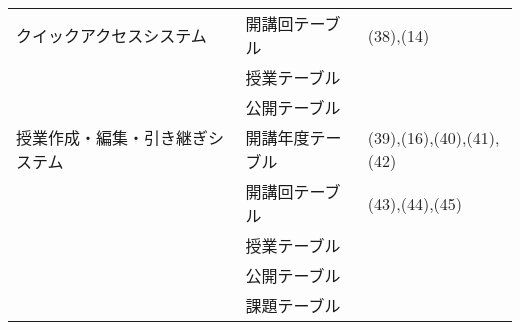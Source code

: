 \begin{table}[h]
\begin{tabular}{|l|l|l|}
    クイックアクセスシステム & 開講回テーブル & (38),(14)\\ \cline{2-2}
                        　& 授業テーブル & \\ \cline{2-2}
                        　& 公開テーブル & \\ \hline
    授業作成・編集・引き継ぎシステム & 開講年度テーブル & (39),(16),(40),(41),(42)\\ \cline{2-2}
                                & 開講回テーブル & (43),(44),(45)\\ \cline{2-2}
                                & 授業テーブル & \\ \cline{2-2}
                                & 公開テーブル & \\ \cline{2-2}
                                & 課題テーブル & \\ \hline
                              \end{tabular}
                          	\end{table}


